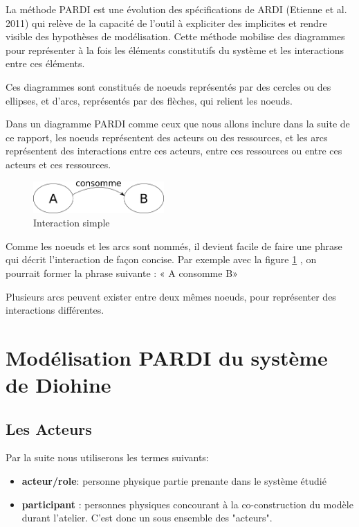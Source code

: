 La méthode PARDI est une évolution des spécifications de ARDI (Etienne et al. 2011) qui relève de la capacité de l'outil à expliciter des implicites et rendre visible des  hypothèses de modélisation. Cette méthode mobilise des diagrammes pour représenter à la fois les éléments constitutifs du système et les interactions entre ces éléments.

Ces diagrammes sont constitués de noeuds représentés par des cercles ou des ellipses, et d'arcs, représentés par des flèches, qui relient les noeuds.

Dans un diagramme PARDI comme ceux que nous allons inclure dans la suite de ce rapport, les noeuds représentent des acteurs ou des ressources, et les arcs représentent des interactions entre ces acteurs, entre ces ressources ou entre ces acteurs et ces ressources.

\begin{figure}
  \begin{center}
    \includegraphics[width=5cm]{img/diagramme_simple.png}
  \end{center}
  \caption{Interaction simple }
  \label{simple_interac}
\end{figure}



Comme les noeuds et les arcs sont nommés, il devient facile de faire une phrase qui décrit l'interaction de façon concise. Par exemple avec la figure \ref{simple_interac} , on pourrait former la phrase suivante : « A consomme B»

Plusieurs arcs peuvent exister entre deux mêmes noeuds, pour représenter des interactions différentes.


\section{Modélisation PARDI du système de Diohine}

\subsection{Les Acteurs}

Par la suite nous utiliserons les termes suivants:
\begin{itemize}
  \item \textbf{acteur/role}: personne physique partie prenante dans le système étudié
  \item \textbf{participant} : personnes physiques concourant à la co-construction du modèle durant l'atelier. C'est donc un sous ensemble des "acteurs".
\end{itemize}

